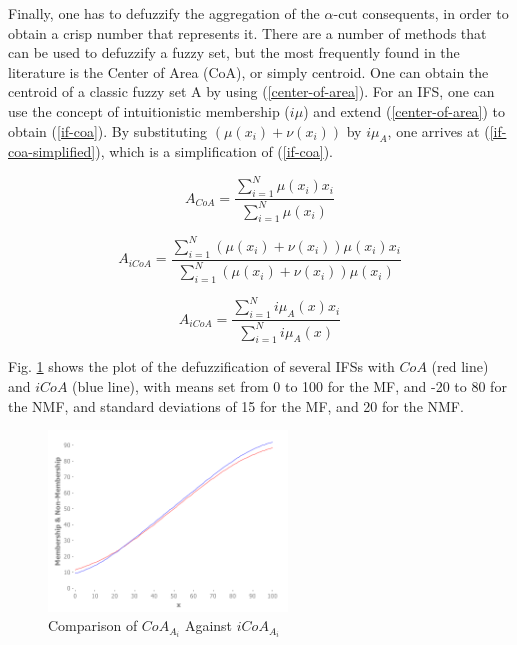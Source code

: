\documentclass[conference]{IEEEtran}
\begin{document}
Finally, one has to defuzzify the aggregation of the $\alpha$-cut
consequents, in order to obtain a crisp number that represents
it. There are a number of methods that can be used to defuzzify a
fuzzy set, but the most frequently found in the literature is the
Center of Area (CoA), or simply centroid. One can obtain the centroid
of a classic fuzzy set A by using (\ref{center-of-area}). For an
IFS, one can use the concept of intuitionistic membership ($i\mu$) and
extend (\ref{center-of-area}) to obtain (\ref{if-coa}). By
substituting $(\mu(x_{i}) + \nu(x_{i}))$ by $i\mu_{A}$, one arrives at
(\ref{if-coa-simplified}), which is a simplification of (\ref{if-coa}).

\begin{equation}
  \label{center-of-area}
  A_{CoA} = \dfrac{\sum_{i=1}^{N} \mu(x_{i})
    x_{i}}{\sum_{i=1}^{N} \mu(x_{i})}
\end{equation}

\begin{equation}
  \label{if-coa}
  A_{iCoA} = \dfrac{\sum_{i=1}^{N} (\mu(x_{i}) + \nu(x_{i})) \mu(x_{i})
    x_{i}}{\sum_{i=1}^{N} (\mu(x_{i}) + \nu(x_{i})) \mu(x_{i})}
\end{equation}

\begin{equation}
  \label{if-coa-simplified}
  A_{iCoA} = \dfrac{\sum_{i=1}^{N} i\mu_{A}(x) x_{i}}{\sum_{i=1}^{N}
    i\mu_{A}(x)}
\end{equation}

Fig. \ref{if-coa-vs-coa} shows the plot of the defuzzification of
several IFSs with $CoA$ (red line) and $iCoA$ (blue line), with means set
from 0 to 100 for the MF, and -20 to 80 for the NMF, and standard
deviations of 15 for the MF, and 20 for the NMF.

\begin{figure}[!t]
  \centering
  \includegraphics[width=2.5in]{if-coa-vs-coa}
  \caption{Comparison of $CoA_{A_{i}}$ Against $iCoA_{A_{i}}$}
  \label{if-coa-vs-coa}
\end{figure}
\end{document}
